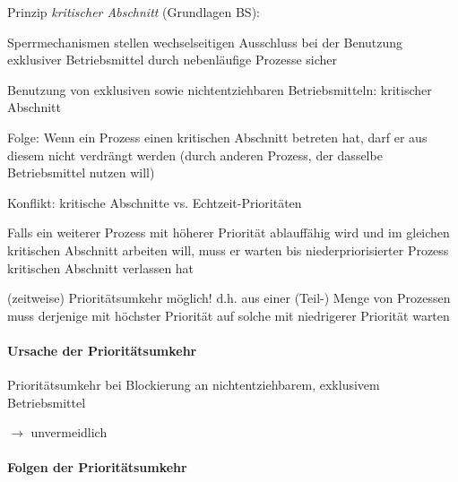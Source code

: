 \documentclass[a4paper]{article}
\begin{document}
\begin{multicols}{3}
    \begin{itemize*}
        \item
        Prinzip \emph{kritischer Abschnitt} (Grundlagen BS):
        \begin{itemize*}
            \item Sperrmechanismen stellen wechselseitigen Ausschluss bei der Benutzung exklusiver Betriebsmittel durch nebenläufige Prozesse sicher
            \item Benutzung von exklusiven sowie nichtentziehbaren Betriebsmitteln: kritischer Abschnitt
            \item Folge: Wenn ein Prozess einen kritischen Abschnitt betreten hat, darf er aus diesem nicht verdrängt werden (durch anderen Prozess, der dasselbe Betriebsmittel nutzen will)
        \end{itemize*}
        \item
        Konflikt: kritische Abschnitte vs. Echtzeit-Prioritäten
        \begin{itemize*}
            \item Falls ein weiterer Prozess mit höherer Priorität ablauffähig wird und im gleichen kritischen Abschnitt arbeiten will, muss er warten bis niederpriorisierter Prozess kritischen Abschnitt verlassen hat
            \item (zeitweise) Prioritätsumkehr möglich! d.h. aus einer (Teil-) Menge von Prozessen muss derjenige mit höchster Priorität auf solche mit niedrigerer Priorität warten
        \end{itemize*}
    \end{itemize*}


    \paragraph{Ursache der
        Prioritätsumkehr}

    \begin{itemize*}
        \item
        Prioritätsumkehr bei Blockierung an nichtentziehbarem, exklusivem
        Betriebsmittel
        \item
        $\rightarrow$ unvermeidlich
    \end{itemize*}


    \paragraph{Folgen der
        Prioritätsumkehr}


\end{multicols}
\end{document}
